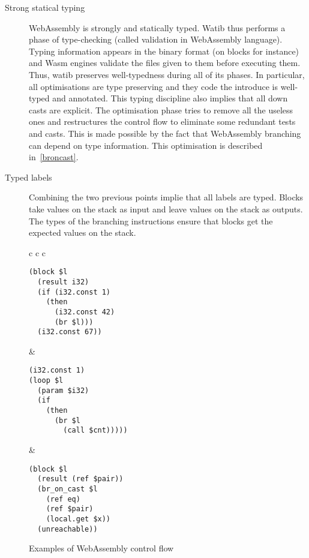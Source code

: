 \documentclass[10pt]{article}
\begin{document}
\begin{description}
\item[Strong statical typing] WebAssembly is strongly and statically typed.
  Watib thus performs a phase of type-checking (called validation in WebAssembly
  language). Typing information appears in the binary format (on blocks for
  instance) and Wasm engines validate the files given to them before executing
  them. Thus, watib preserves well-typedness during all of its phases. In
  particular, all optimisations are type preserving and they code the introduce
  is well-typed and annotated. This typing discipline also implies that all down
  casts are explicit. The optimisation phase tries to remove all the useless
  ones and restructures the control flow to eliminate some redundant tests and
  casts. This is made possible by the fact that WebAssembly branching can depend
  on type information. This optimisation is described in~\ref{broncast}.


\item[Typed labels]
Combining the two previous points implie that all labels are typed. Blocks take
values on the stack as input and leave values on the stack as outputs. The types
of the branching instructions ensure that blocks get the expected values on the
stack.
\end{description}
\begin{figure}[h]
\centering
\begin{tabular}{c c c}
\begin{minipage}{1.8in}
\begin{verbatim}
(block $l
  (result i32)
  (if (i32.const 1)
    (then
      (i32.const 42)
      (br $l)))
  (i32.const 67))
\end{verbatim}
\end{minipage}&
\begin{minipage}{1.8in}
\begin{verbatim}
(i32.const 1)
(loop $l
  (param $i32)
  (if
    (then
      (br $l
        (call $cnt)))))
\end{verbatim}
\end{minipage}
&\begin{minipage}{1.8in}
\begin{verbatim}
(block $l
  (result (ref $pair))
  (br_on_cast $l
    (ref eq)
    (ref $pair)
    (local.get $x))
  (unreachable))
\end{verbatim}
\end{minipage}
\end{tabular}
\caption{Examples of WebAssembly control flow}\label{cf-ex}
\end{figure}
\end{document}
